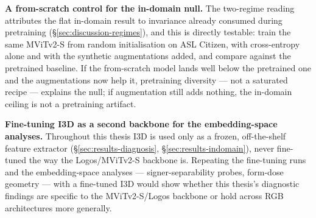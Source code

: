 \textbf{A from-scratch control for the in-domain null.}  The two-regime
reading attributes the flat in-domain result to invariance already
consumed during pretraining (\S\ref{sec:discussion-regimes}), and this
is directly testable: train the same MViTv2-S from random initialisation
on ASL Citizen, with cross-entropy alone and with the synthetic
augmentations added, and compare against the pretrained baseline. If the
from-scratch model lands well below the pretrained one and the
augmentations now help it, pretraining diversity --- not a saturated
recipe --- explains the null; if augmentation still adds nothing, the
in-domain ceiling is not a pretraining artifact. 

\textbf{Fine-tuning I3D as a second backbone for the embedding-space
analyses.} Throughout this thesis I3D is used only as a frozen,
off-the-shelf feature extractor (\S\ref{sec:results-diagnosis},
\S\ref{sec:results-indomain}), never fine-tuned the way the Logos/MViTv2-S
backbone is. Repeating the fine-tuning runs and the embedding-space
analyses --- signer-separability probes, form-dose geometry --- with a
fine-tuned I3D would show whether this thesis's diagnostic findings are
specific to the MViTv2-S/Logos backbone or hold across RGB architectures
more generally.
